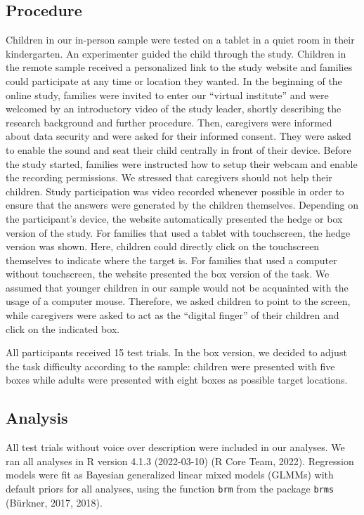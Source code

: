 \documentclass[
  man,floatsintext]{apa6}
\begin{document}
\hypertarget{procedure}{%
\subsection{Procedure}\label{procedure}}

Children in our in-person sample were tested on a tablet in a quiet room in their kindergarten. An experimenter guided the child through the study. Children in the remote sample received a personalized link to the study website and families could participate at any time or location they wanted. In the beginning of the online study, families were invited to enter our ``virtual institute'' and were welcomed by an introductory video of the study leader, shortly describing the research background and further procedure. Then, caregivers were informed about data security and were asked for their informed consent. They were asked to enable the sound and seat their child centrally in front of their device. Before the study started, families were instructed how to setup their webcam and enable the recording permissions. We stressed that caregivers should not help their children. Study participation was video recorded whenever possible in order to ensure that the answers were generated by the children themselves.
Depending on the participant's device, the website automatically presented the hedge or box version of the study. For families that used a tablet with touchscreen, the hedge version was shown. Here, children could directly click on the touchscreen themselves to indicate where the target is. For families that used a computer without touchscreen, the website presented the box version of the task. We assumed that younger children in our sample would not be acquainted with the usage of a computer mouse. Therefore, we asked children to point to the screen, while caregivers were asked to act as the ``digital finger'' of their children and click on the indicated box.

All participants received 15 test trials. In the box version, we decided to adjust the task difficulty according to the sample: children were presented with five boxes while adults were presented with eight boxes as possible target locations.

\hypertarget{analysis}{%
\subsection{Analysis}\label{analysis}}

All test trials without voice over description were included in our analyses. We ran all analyses in R version 4.1.3 (2022-03-10) (R Core Team, 2022). Regression models were fit as Bayesian generalized linear mixed models (GLMMs) with default priors for all analyses, using the function \texttt{brm} from the package \texttt{brms} (Bürkner, 2017, 2018).
\end{document}
